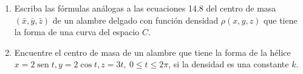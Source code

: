 \item
    \begin{enumerate}
        \item[(a)] Escriba las fórmulas análogas a las ecuaciones 14.8 del centro de masa $(\bar{x}, \bar{y}, \bar{z})$ de un alambre delgado con función densidad $\rho(x, y, z)$ que tiene la forma de una curva del espacio $C$.
        \item[(b)] Encuentre el centro de masa de un alambre que tiene la forma de la hélice $x = 2 \operatorname{sen} t, y = 2 \cos t, z = 3t, \ 0 \le t \le 2\pi$, si la densidad es una constante $k$.
    \end{enumerate}
